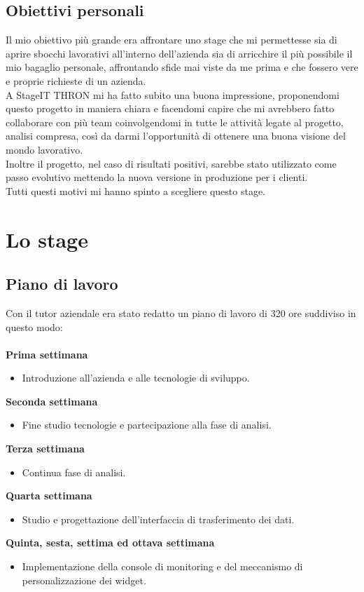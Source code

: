 \documentclass[a4paper, 12pt, twoside, openright]{book}
\begin{document}
\section{Obiettivi personali}
Il mio obiettivo più grande era affrontare uno stage che mi permettesse sia di aprire sbocchi lavorativi all'interno dell'azienda sia di arricchire il più possibile il mio bagaglio personale, affrontando sfide mai viste da me prima e che fossero vere e proprie richieste di un azienda.\\

A StageIT THRON mi ha fatto subito una buona impressione, proponendomi questo progetto in maniera chiara e facendomi capire che mi avrebbero fatto collaborare con più team coinvolgendomi in tutte le attività legate al progetto, analisi compresa, così da darmi l'opportunità di ottenere una buona visione del mondo lavorativo.\\
Inoltre il progetto, nel caso di risultati positivi, sarebbe stato utilizzato come passo evolutivo mettendo la nuova versione in produzione per i clienti.\\
Tutti questi motivi mi hanno spinto a scegliere questo stage.

\chapter{Lo stage}

\section{Piano di lavoro}
Con il tutor aziendale era stato redatto un piano di lavoro di 320 ore suddiviso in questo modo:\\ \\
\textbf{Prima settimana}
\begin{itemize}
\item Introduzione all'azienda e alle tecnologie di sviluppo.
\end{itemize}
\textbf{Seconda settimana}
\begin{itemize}
\item Fine studio tecnologie e partecipazione alla fase di analisi.
\end{itemize}
\textbf{Terza settimana}
\begin{itemize}
\item Continua fase di analisi.
\end{itemize}
\textbf{Quarta settimana}
\begin{itemize}
\item Studio e progettazione dell'interfaccia di trasferimento dei dati.
\end{itemize}
\textbf{Quinta, sesta, settima ed ottava settimana}
\begin{itemize}
\item Implementazione della console di monitoring e del meccanismo di personalizzazione dei widget.
\end{itemize}
\end{document}
